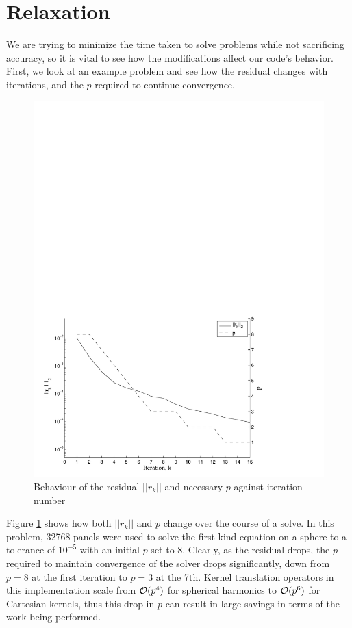 \section{Relaxation}\label{sec:laplace_relaxation}

We are trying to minimize the time taken to solve {\bem} problems while not sacrificing accuracy, so it is vital to see how the modifications affect our code's behavior. First, we look at an example problem and see how the residual changes with {\gmres} iterations, and the $p$ required to continue convergence.

\begin{figure}[h]
	\centering
	\includegraphics[width=14cm]{img/resid_p_iteration.pdf}
	\caption{Behaviour of the residual $||r_{k}||$ and necessary $p$ against {\gmres} iteration number}
	\label{fig:residualp}
\end{figure}

Figure \ref{fig:residualp} shows how both $||r_{k}||$ and $p$ change over the course of a solve. In this problem, 32768 panels were used to solve the first-kind equation on a sphere to a tolerance of $10^{-5}$ with an initial $p$ set to 8. Clearly, as the residual drops, the $p$ required to maintain convergence of the solver drops significantly, down from $p=8$ at the first iteration to $p=3$ at the 7th. Kernel translation operators in this implementation scale from $\mathcal{O}(p^{4})$ for spherical harmonics to $\mathcal{O}(p^{6})$ for Cartesian kernels, thus this drop in $p$ can result in large savings in terms of the work being performed. %

